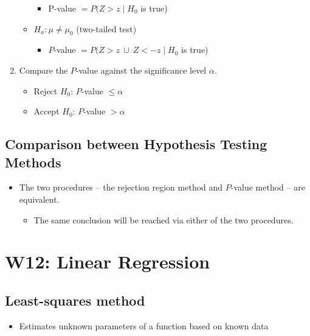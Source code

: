 \documentclass[a4paper]{article}
\begin{document}
\begin{enumerate}
\begin{itemize}
        \begin{itemize}[label=$\circ$]
            \item P-value $= P(Z > z\mid H_{0}$ is true)
        \end{itemize}
        \item $H_{a}: \mu \neq \mu_{0}$ (two-tailed test)
        \begin{itemize}[label=$\circ$]
            \item $P$-value $= P(Z > z \ \cup  \ Z < -z\mid H_{0}$ is true)
        \end{itemize}
    \end{itemize}
    \item Compare the $P$-value against the significance level $\alpha$.
    \begin{itemize}
        \item Reject $H_{0}$: $P$-value $\leq \alpha$
        \item Accept $H_{0}$: $P$-value $> \alpha$
    \end{itemize}
\end{enumerate}
\subsection{Comparison between Hypothesis Testing Methods}
\begin{itemize}
    \item The two procedures -- the rejection region method and $P$-value method -- are equivalent.
    \begin{itemize}[label=$\circ$]
        \item The same conclusion will be reached via either of the two procedures.
    \end{itemize}
\end{itemize}
\newpage
\section{W12: Linear Regression}
\subsection{Least-squares method}
\begin{itemize}
    \item Estimates unknown parameters of a function based on known data
\end{itemize}
\end{document}
